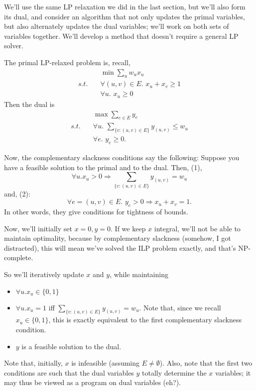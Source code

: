 \documentclass{article}
\begin{document}
We'll use the same LP relaxation we did in the last section, but we'll also
form its dual, and consider an algorithm that not only updates the
primal variables, but also alternately updates the dual variables; we'll
work on both sets of variables together. We'll develop a method that doesn't
require a general LP solver.

The primal LP-relaxed problem is, recall,
\begin{align}
& \min \sum_u w_u x_u \\
s.t.\quad & \forall (u,v)\in E.\,\, x_u + x_v \geq 1 \\
& \forall u.\,\, x_u \geq 0
\end{align}
Then the dual is
\begin{align}
& \max \sum_{e\in E} y_e \\
s.t.\quad & \forall u.\,\, \sum_{\{v : (u,v)\in E\}} y_{(u,v)} \leq w_u \\
& \forall e.\,\, y_e \geq 0.
\end{align}

Now, the complementary slackness conditions say the following: Suppose you
have a feasible solution to the primal and to the dual.
Then, (1),
$$
\forall u. x_u > 0 
\Longrightarrow
\sum_{\{v : (u,v) \in E\}}
y_{(u,v)} = w_u
$$
and, (2):
$$
\forall e = (u,v)\in E.\,\,
y_e > 0 \Longrightarrow
x_u + x_v = 1.
$$
In other words, they give conditions for tightness of bounds.

Now, we'll initially set $x=0, y=0$. If we keep $x$ integral, we'll not
be able to maintain optimality, because by complementary slackness (somehow,
I got distracted), this will mean we've solved the ILP problem exactly,
and that's NP-complete.

So we'll iteratively update $x$ and $y$, while maintaining
\begin{itemize}
\item
$\forall u. x_u \in \{0,1\}$

\item
$\forall u. x_u = 1$ iff $\sum_{\{v : (u,v)\in E\}} y_{(u,v)} = w_u$.
Note that, since we recall $x_u \in \{0,1\}$, this is exactly 
equivalent to the first complementary slackness condition.

\item
$y$ is a feasible solution to the dual.
\end{itemize}
Note that, initially, $x$ is infeasible (assuming $E\neq \emptyset$).
Also, note that the first two conditions are such that the dual
variables $y$ totally determine the $x$ variables; it may thus be viewed
as a program on dual variables (eh?).
\end{document}
